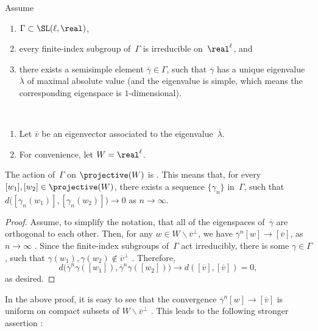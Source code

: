 \begin{assump} \label{ProxAssump}
Assume 
	\begin{enumerate}
	\item $\Gamma \subset \SL(\ell,\real)$, 
	\item every finite-index subgroup of~$\Gamma$ is irreducible on~$\real^\ell$,
	and 
	\item there exists a semisimple element $\overline\gamma \in \Gamma$, such that $\overline\gamma$ has a unique eigenvalue~$\overline\lambda$ of maximal absolute value (and the eigenvalue is simple, which means the corresponding eigenspace is $1$-dimensional).
	\end{enumerate}
\end{assump}

\begin{notation} \ 
\begin{enumerate}
\item Let $\overline{v}$ be an eigenvector associated to the eigenvalue~$\overline\lambda$.
\item For convenience, let $W = \real^\ell$.
\end{enumerate}
\end{notation}

\begin{lem}[(Proximality)] \label{ProxLem}
The action of\/~$\Gamma$ on\/ $\projective(W)$ is {\upshape{}}. This means that, for every $[w_1],[w_2] \in \projective(W)$, there exists a sequence $\{\gamma_n\}$ in~$\Gamma$, such that $d\bigl( [\gamma_n(w_1)],[\gamma_n(w_2)] \bigr) \to 0$ as $n \to \infty$.
\end{lem}

\begin{proof}
Assume, to simplify the notation, that all of the eigenspaces of~$\overline\gamma$ are orthogonal to each other. 
Then, for any $w \in W \smallsetminus \overline{v}^\perp$, we have $\overline\gamma^n[w] \to [\overline{v}]$, as $n \to \infty$ . Since the finite-index subgroups of~$\Gamma$ act irreducibly, there is some $\gamma \in \Gamma$, such that $\gamma(w_1), \gamma(w_2) \notin \overline{v}^\perp$ . Therefore, 
	$$d\bigl( \overline\gamma^n\gamma ([w_1]), \overline\gamma^n\gamma ([w_2]) \bigr) 
	\to d( [\overline{v}],[\overline{v}]) 
	= 0 ,$$
as desired.
\end{proof}

In the above proof, it is easy to see that the convergence $\overline\gamma^n[w] \to [\overline{v}]$ is uniform on compact subsets of $W \smallsetminus \overline{v}^\perp$ . This leads to the following stronger assertion :

